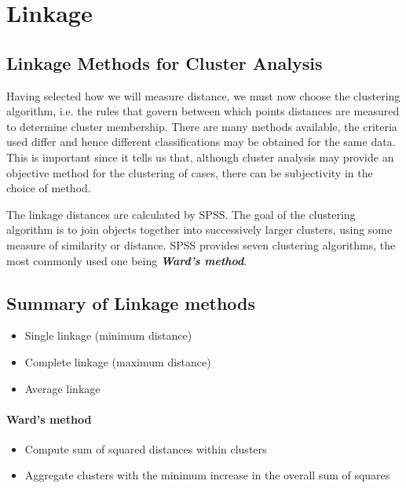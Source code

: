 \documentclass[a4paper,12pt]{report}
\begin{document}


\tableofcontents

\chapter{Linkage}
\section{Linkage Methods for Cluster Analysis}
Having selected how we will measure distance, we must now choose the clustering algorithm, i.e. the rules that govern between which points distances are measured to determine cluster membership. There are many methods available, the criteria used differ and hence
different classifications may be obtained for the same data. This is important since it tells us that, although cluster analysis may provide an objective method for the clustering of cases, there can be subjectivity in the choice of method. 

The linkage distances are calculated by SPSS. The goal of the clustering algorithm is to join objects together into successively larger clusters, using some measure of similarity or distance. SPSS provides seven clustering algorithms, the most commonly used one being  \textbf{\textit{Ward's method}}.


\section{Summary of Linkage methods}
\begin{itemize}
	\item  Single linkage (minimum distance)
	\item  Complete linkage (maximum distance)
	\item  Average linkage
\end{itemize}


\subsubsection{Ward's method}
\begin{itemize}
	\item  Compute sum of squared distances within clusters
	\item  Aggregate clusters with the minimum increase in the
	overall sum of squares
\end{itemize}
\end{document}
